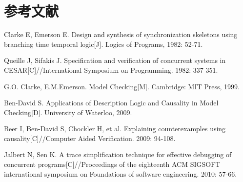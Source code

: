 \documentclass[a4paper,10pt]{article}
\begin{document}
\section{参考文献}
\small
\begin{thebibliography}{99}
\setlength{\itemsep}{0pt}
\setlength{\parskip}{0pt}  %
 Clarke E, Emerson E. Design and synthesis of synchronization skeletons using branching time temporal logic[J]. Logics of Programs, 1982: 52-71.

 Queille J, Sifakis J. Specification and verification of concurrent systems in CESAR[C]//International Symposium on Programming. 1982: 337-351.

G.O. Clarke, E.M.Emerson. Model Checking[M]. Cambridge: MIT Press, 1999.

 Ben-David S. Applications of Description Logic and Causality in Model Checking[D]. University of Waterloo, 2009.

 Beer I, Ben-David S, Chockler H, et al. Explaining counterexamples using causality[C]//Computer Aided Verification. 2009: 94-108.

 Jalbert N, Sen K. A trace simplification technique for effective debugging of concurrent programs[C]//Proceedings of the eighteenth ACM SIGSOFT international symposium on Foundations of software engineering. 2010: 57-66.




\end{thebibliography}
\end{document}

